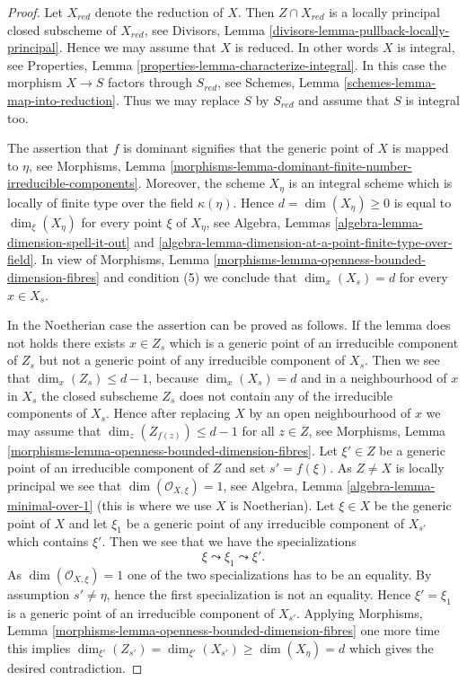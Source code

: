 \begin{proof}
Let $X_{red}$ denote the reduction of $X$. Then $Z \cap X_{red}$ is
a locally principal closed subscheme of $X_{red}$, see
Divisors, Lemma \ref{divisors-lemma-pullback-locally-principal}.
Hence we may assume that $X$ is reduced. In other words $X$ is integral, see
Properties, Lemma \ref{properties-lemma-characterize-integral}.
In this case the morphism $X \to S$ factors through $S_{red}$, see
Schemes, Lemma \ref{schemes-lemma-map-into-reduction}.
Thus we may replace $S$ by $S_{red}$ and assume that $S$ is integral too.

\medskip\noindent
The assertion that $f$ is dominant signifies that the generic point of $X$
is mapped to $\eta$, see
Morphisms,
Lemma \ref{morphisms-lemma-dominant-finite-number-irreducible-components}.
Moreover, the scheme $X_\eta$ is an integral scheme which is locally of
finite type over the field $\kappa(\eta)$. Hence
$d = \dim(X_\eta) \geq 0$ is equal to $\dim_\xi(X_\eta)$ for
every point $\xi$ of $X_\eta$, see
Algebra, Lemmas \ref{algebra-lemma-dimension-spell-it-out} and
\ref{algebra-lemma-dimension-at-a-point-finite-type-over-field}.
In view of
Morphisms, Lemma \ref{morphisms-lemma-openness-bounded-dimension-fibres}
and condition (5) we conclude that $\dim_x(X_s) = d$
for every $x \in X_s$.

\medskip\noindent
In the Noetherian case the assertion can be proved as follows.
If the lemma does not holds there exists $x \in Z_s$ which is a generic
point of an irreducible component of $Z_s$ but not a generic point
of any irreducible component of $X_s$. Then we see that
$\dim_x(Z_s) \leq d - 1$, because $\dim_x(X_s) = d$ and in a neighbourhood
of $x$ in $X_s$ the closed subscheme $Z_s$ does not contain any of the
irreducible components of $X_s$. Hence after replacing $X$ by an
open neighbourhood of $x$ we may assume that
$\dim_z(Z_{f(z)}) \leq d - 1$ for all $z \in Z$, see
Morphisms, Lemma \ref{morphisms-lemma-openness-bounded-dimension-fibres}.
Let $\xi' \in Z$ be a generic point of an irreducible component of $Z$
and set $s' = f(\xi)$. As $Z \not = X$ is locally principal we see that
$\dim(\mathcal{O}_{X, \xi}) = 1$, see
Algebra, Lemma \ref{algebra-lemma-minimal-over-1}
(this is where we use $X$ is Noetherian).
Let $\xi \in X$ be the generic point of $X$ and
let $\xi_1$ be a generic point of any irreducible component
of $X_{s'}$ which contains $\xi'$. Then we see that we have
the specializations
$$
\xi \leadsto \xi_1 \leadsto \xi'.
$$
As $\dim(\mathcal{O}_{X, \xi}) = 1$ one of the two specializations
has to be an equality.
By assumption $s' \not = \eta$, hence the first specialization
is not an equality.
Hence $\xi' = \xi_1$ is a generic point of an irreducible component of
$X_{s'}$. Applying
Morphisms, Lemma \ref{morphisms-lemma-openness-bounded-dimension-fibres}
one more time this implies
$\dim_{\xi'}(Z_{s'}) = \dim_{\xi'}(X_{s'}) \geq \dim(X_\eta) = d$
which gives the desired contradiction.


\end{proof}
